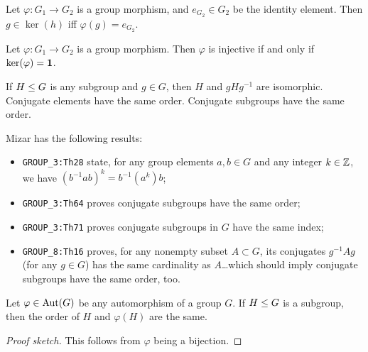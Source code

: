 \begin{theorem}
  Let $\varphi\colon G_{1}\to G_{2}$ is a group morphism, and
  $e_{G_{2}}\in G_{2}$ be the identity element.
  Then $g\in\ker(h)$ iff $\varphi(g)=e_{G_{2}}$.
\end{theorem}

\begin{theorem}
  Let $\varphi\colon G_{1}\to G_{2}$ is a group morphism.
  Then $\varphi$ is injective if and only if $\ker(\varphi)=\mathbf{1}$.
\end{theorem}

\begin{theorem}
  If $H\leq G$ is any subgroup and $g\in G$, then
  $H$ and $gHg^{-1}$ are isomorphic. Conjugate elements have the same
  order. Conjugate subgroups have the same order.
\end{theorem}

\begin{thm-remark}
Mizar has the following results:
\begin{itemize}
\item \verb#GROUP_3:Th28# state, for any group elements $a,b\in G$ and
  any integer $k\in\mathbb{Z}$, we have $(b^{-1}ab)^{k} = b^{-1}(a^{k})b$;
\item \verb#GROUP_3:Th64# proves conjugate subgroups have the same order;
\item \verb#GROUP_3:Th71# proves conjugate subgroups in $G$ have the
  same index;
\item \verb#GROUP_8:Th16# proves, for any nonempty subset $A\subset G$,
  its conjugates $g^{-1}Ag$ (for any $g\in G$) has the same cardinality
  as $A$\dots which should imply conjugate subgroups have the same
  order, too.
\end{itemize}
\end{thm-remark}

\begin{theorem}\label{thm:pure-math:iso-subgroups-have-same-order}
  Let $\varphi\in\operatorname{Aut}(G)$ be any automorphism of a group $G$.
  If $H\leq G$ is a subgroup, then the order of $H$ and
  $\varphi(H)$ are the same.
\end{theorem}

\begin{proof}[Proof sketch]
This follows from $\varphi$ being a bijection.
\end{proof}

